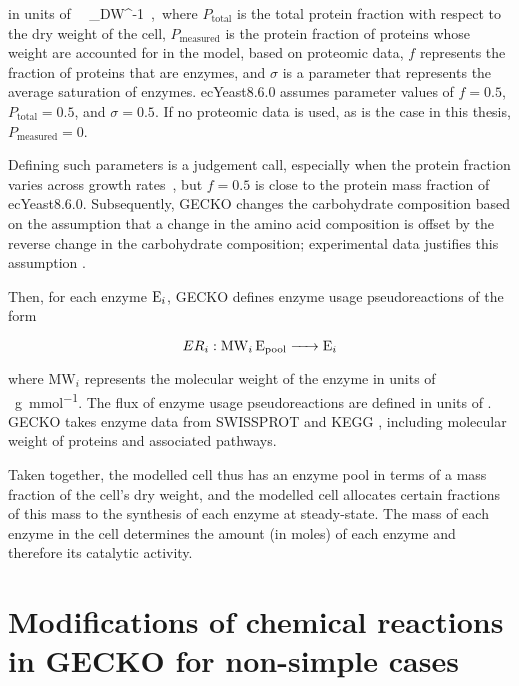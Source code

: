in units of \SI{}{\gram~\gram_{DW}^{-1}}, where
$P_{\mathrm{total}}$ is the total protein fraction with respect to the dry weight of the cell,
$P_{\mathrm{measured}}$ is the protein fraction of proteins whose weight are accounted for in the model, based on proteomic data,
$f$ represents the fraction of proteins that are enzymes, and
$\sigma$ is a parameter that represents the average saturation of enzymes.
ecYeast8.6.0 assumes parameter values of $f = 0.5$, $P_{\mathrm{total}} = 0.5$, and $\sigma = 0.5$.
If no proteomic data is used, as is the case in this thesis, $P_{\mathrm{measured}} = 0$.

Defining such parameters is a judgement call, especially when the protein fraction varies across growth rates~\parencite{elsemmanWholecellModelingYeast2022}, but $f = 0.5$ is close to the protein mass fraction of ecYeast8.6.0.
Subsequently, GECKO changes the carbohydrate composition based on the assumption that a change in the amino acid composition is offset by the reverse change in the carbohydrate composition;
experimental data justifies this assumption \parencite{nissenFluxDistributionsAnaerobic1997}.

Then, for each enzyme $\ce{E_{i}}$, GECKO defines enzyme usage pseudoreactions of the form

\begin{equation}
  ER_{i}: \ce{ MW_{i} E_{\mathrm{pool}} -> E_{i} }
  \label{eq:model-gecko-enzyme-usage}
\end{equation}

where $\mathrm{MW}_{i}$ represents the molecular weight of the enzyme in units of \SI{}{\gram~\milli\mole^{-1}}.
The flux of enzyme usage pseudoreactions are defined in units of \SI{}{\mmolgdw}.
GECKO takes enzyme data from SWISSPROT \parencite{theuniprotconsortiumUniProtUniversalProtein2023} and KEGG \parencite{kanehisaKEGGTaxonomybasedAnalysis2023}, including molecular weight of proteins and associated pathways.

Taken together, the modelled cell thus has an enzyme pool in terms of a mass fraction of the cell's dry weight, and the modelled cell allocates certain fractions of this mass to the synthesis of each enzyme at steady-state.
The mass of each enzyme in the cell determines the amount (in moles) of each enzyme and therefore its catalytic activity.


\section{Modifications of chemical reactions in GECKO for non-simple cases}
\label{append:model-gecko-nonsimple}

